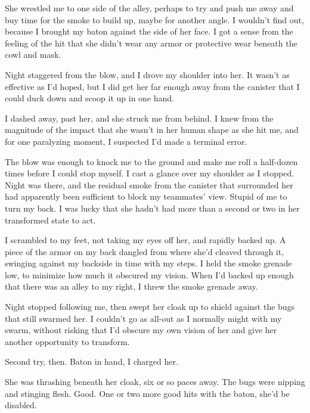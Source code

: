 She wrestled me to one side of the alley, perhaps to try and push me away and buy time for the smoke to build up, maybe for another angle.  I wouldn't find out, because I brought my baton against the side of her face.  I got a sense from the feeling of the hit that she didn't wear any armor or protective wear beneath the cowl and mask.



Night staggered from the blow, and I drove my shoulder into her.  It wasn't as effective as I'd hoped, but I did get her far enough away from the canister that I could duck down and scoop it up in one hand.



I dashed away, past her, and she struck me from behind.  I knew from the magnitude of the impact that she wasn't in her human shape as she hit me, and for one paralyzing moment, I suspected I'd made a terminal error.



The blow was enough to knock me to the ground and make me roll a half-dozen times before I could stop myself.  I cast a glance over my shoulder as I stopped.  Night was there, and the residual smoke from the canister that surrounded her had apparently been sufficient to block my teammates' view.  Stupid of me to turn my back.  I was lucky that she hadn't had more than a second or two in her transformed state to act.



I scrambled to my feet, not taking my eyes off her, and rapidly backed up.  A piece of the armor on my back dangled from where she'd cleaved through it, swinging against my backside in time with my steps.  I held the smoke grenade low, to minimize how much it obscured my vision.  When I'd backed up enough that there was an alley to my right, I threw the smoke grenade away.



Night stopped following me, then swept her cloak up to shield against the bugs that still swarmed her.  I couldn't go as all-out as I normally might with my swarm, without risking that I'd obscure my own vision of her and give her another opportunity to transform.



Second try, then.  Baton in hand, I charged her.



She was thrashing beneath her cloak, six or so paces away.  The bugs were nipping and stinging flesh.  Good.  One or two more good hits with the baton, she'd be disabled.



